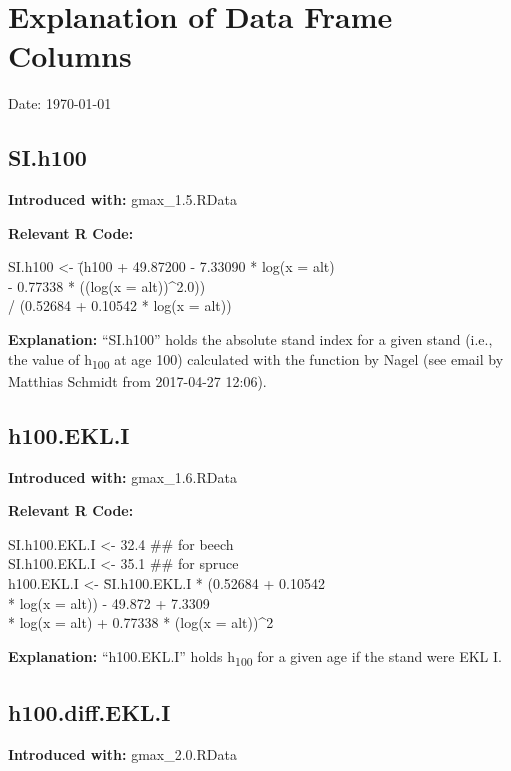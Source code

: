 \section{Explanation of Data Frame Columns}

Date: \today

\subsection{SI.h100}
\textbf{Introduced with:} gmax\_1.5.RData

\textbf{Relevant R Code:}

\begin{rcode}
  SI.h100 <- \=(h100 + 49.87200 - 7.33090 * log(x = alt) \\
  \>- 0.77338 * ((log(x = alt))\textasciicircum 2.0)) \\
  \>/ (0.52684 + 0.10542 * log(x = alt))
\end{rcode}

\textbf{Explanation:} ``SI.h100'' holds the absolute stand index for a given stand (i.e., the value of h\textsubscript{100} at age \SI{100}{\years}) calculated with the function by Nagel (see email by Matthias Schmidt from 2017-04-27 12:06).

\subsection{h100.EKL.I}
\textbf{Introduced with:} gmax\_1.6.RData

\textbf{Relevant R Code:}

\begin{rcode}
  SI.h100.EKL.I <- 32.4  \#\# for beech \\
  SI.h100.EKL.I <- 35.1  \#\# for spruce \\
  h100.EKL.I <- \=SI.h100.EKL.I * (0.52684 + 0.10542 \\
  \>* log(x = alt)) - 49.872 + 7.3309 \\
  \>* log(x = alt) + 0.77338 * (log(x = alt))\textasciicircum 2
\end{rcode}

\textbf{Explanation:} ``h100.EKL.I'' holds h\textsubscript{100} for a given age if the stand were EKL I.

\subsection{h100.diff.EKL.I}
\textbf{Introduced with:} gmax\_2.0.RData

